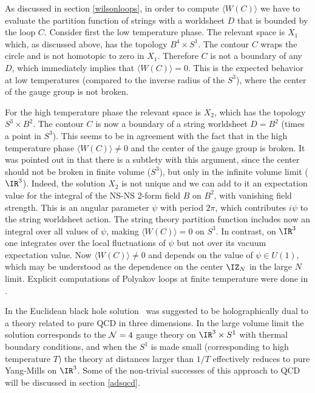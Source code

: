 As discussed in section \ref{wilsonloops}, 
in order to compute $\langle W(C) \rangle$ we have to 
evaluate the partition function of strings with a 
worldsheet $D$ that is bounded
by the loop $C$. 
Consider first the low temperature phase. The relevant space 
is $X_1$ which, as discussed
above,  has
the topology $B^4 \times S^1$.
The contour $C$ wraps the circle and is not homotopic to zero in $X_1$.
Therefore $C$ is not a boundary of any $D$, which immediately
implies that  $\langle W(C) \rangle  = 0$.
This is the expected behavior at low temperatures (compared to the
inverse radius of the $S^3$), where the center
of the gauge group is not broken.

For the high temperature phase the relevant space is $X_2$, which has the
topology $S^3 \times B^2$. The contour $C$ is now a boundary of a
string worldsheet $D=B^2$ (times
a point in $S^3$). This seems to be in agreement with the fact that
in the   high temperature phase $\langle W(C) \rangle  \neq 0$
and the center
of the gauge group is broken. It was pointed out in \cite{Witten:1998zw}
that there is a subtlety with this argument, since the
center should not be broken in finite volume ($S^3$), but only
in the infinite volume limit ($\IR^3$).
Indeed, the solution $X_2$ is not unique
and we can add to it an expectation value for
the integral of the NS-NS 2-form field $B$ on $B^2$, with vanishing
field strength. This is an angular parameter $\psi$
with period $2 \pi$, which contributes $i\psi$ to the string
worldsheet action. The string theory partition function
includes now an integral over all values of
$\psi$, making  $\langle W(C) \rangle  = 0$ on $S^3$.
In contrast, on $\IR^3$ one integrates over the local fluctuations
of $\psi$ but not over its vacuum expectation value. Now
$\langle W(C) \rangle  \neq 0$ and depends on the value of $\psi \in U(1)$,
which may be understood as the dependence on the center $\IZ_N$ in the
large $N$ limit.
Explicit computations of Polyakov loops at finite temperature 
were done in \cite{Rey:1998wp,Brandhuber:1998bs}.

In \cite{Witten:1998zw} the Euclidean black hole solution \AdSSch\ 
was suggested to
be holographically dual to a theory related to
pure QCD in three dimensions.  In the large
volume limit
the solution corresponds to the ${\cal N}=4$ gauge theory on $\IR^3
\times S^1$ with thermal boundary conditions, and when the $S^1$ is made
small (corresponding to high temperature $T$) the theory at distances
larger than $1/T$ effectively reduces to pure Yang-Mills on
$\IR^3$.  Some of the non-trivial successes of this approach to QCD will be
discussed in section \ref{adsqcd}.


